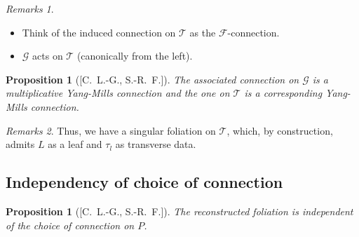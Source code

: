 \documentclass[hyperref={pdfpagelabels=false}]{beamer}
\theoremstyle{plain}
\newtheorem{proposition}[theorem]{Proposition}
\theoremstyle{remark}
\newtheorem*{remark}{Remarks}
\begin{document}
{\begin{frame}
\pause

\begin{remark}
\begin{itemize}
	\item Think of the induced connection on $\mathcal{T}$ as the $\mathcal{F}$-connection.
	\item $\mathcal{G}$ acts on $\mathcal{T}$ (canonically from the left).
\end{itemize}
\end{remark}

\end{frame}

\begin{frame}
\begin{proposition}[{[C.\ L.-G., S.-R.\ F.]}]
The associated connection on $\mathcal{G}$ is a multiplicative Yang-Mills connection and the one on $\mathcal{T}$ is a corresponding Yang-Mills connection.
\end{proposition}

\begin{remark}
Thus, we have a singular foliation on $\mathcal{T}$, which, by construction, admits $L$ as a leaf and $\tau_l$ as transverse data.
\end{remark}
\end{frame}

{

\subsection{Independency of choice of connection}


\begin{frame}
\begin{proposition}[{[C.\ L.-G., S.-R.\ F.]}]
The reconstructed foliation is independent of the choice of connection on $P$.
\end{proposition}
\pause
\begin{center}
\end{center}
\end{frame}

}}
\end{document}
